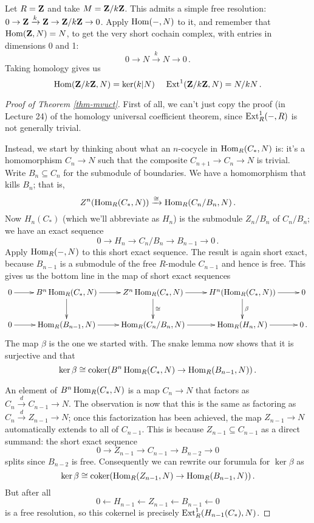 \begin{example}
Let $R=\mathbf Z$ and take $M=\mathbf Z/k\mathbf Z$. This admits a simple free resolution:
$0\to \mathbf Z\xrightarrow{k}\mathbf Z\to\mathbf Z/k\mathbf Z\to 0$. Apply $\operatorname{Hom}(-,N)$ to it,
and remember that $\operatorname{Hom}(\mathbf Z,N)=N$, to get 
the very short cochain complex, with entries in dimensions 0 and 1:
\[
0\to N\xrightarrow{k} N\to0\,.
\]
Taking homology gives us
\[
\operatorname{Hom}(\mathbf Z/k\mathbf Z,N)=\ker(k|N)\,\quad\operatorname{Ext}^1(\mathbf Z/k\mathbf Z,N)=N/kN\,.
\]
\end{example}

\begin{proof}[Proof of Theorem \ref{thm-mvuct}]
First of all, we can't just copy the proof (in Lecture 24) of the
homology universal coefficient theorem, since $\operatorname{Ext}^1_R(-,R)$ is not
generally trivial. 

Instead, we start by thinking about what an $n$-cocycle in $\operatorname{Hom}_R(C_*,N)$ is:
it's a homomorphism $C_n\to N$ such that the composite $C_{n+1}\to C_n\to N$ 
is trivial. Write $B_n\subseteq C_n$ for the submodule of boundaries.
We have a homomorphism that kills $B_n$; that is,
\[
Z^n(\operatorname{Hom}_R(C_*,N))\xrightarrow{\cong}\operatorname{Hom}_R(C_n/B_n,N)\,.
\]
Now $H_n(C_*)$ (which we'll abbreviate as $H_n$) is the submodule
$Z_n/B_n$ of $C_n/B_n$; we have an exact sequence
\begin{equation*}
0\to H_n\to C_n/B_n\to B_{n-1}\to0\,.
\end{equation*}
Apply $\operatorname{Hom}_R(-,N)$ to this short exact sequence. The result is again 
short exact, because $B_{n-1}$ is a submodule of the free $R$-module $C_{n-1}$
and hence is free. This gives us the bottom line in the map of short
exact sequences
\[
\xymatrix{
0 \ar[r] & B^n\Hom_R(C_*,N) \ar[r] \ar[d] & 
Z^n\Hom_R(C_*,N) \ar[d]^\cong \ar[r]
& H^n(\Hom_R(C_*,N)) \ar[d]^\beta \ar[r] & 0\\
0 \ar[r] & \Hom_R(B_{n-1},N) \ar[r] & \Hom_R(C_n/B_n,N) \ar[r] & 
\Hom_R(H_n,N) \ar[r] & 0\,.
}\]
The map $\beta$ is the one we started with. The snake lemma
now shows that it is surjective and that
\[
\ker\beta\cong\operatorname{coker}(B^n\operatorname{Hom}_R(C_*,N)\to\operatorname{Hom}_R(B_{n-1},N))\,.
\]

An element of $B^n\operatorname{Hom}_R(C_*,N)$ is a map $C_n\to N$ that factors as
$C_n\xrightarrow{d}C_{n-1}\to N$. The observation is now that this is
the same as factoring as $C_n\xrightarrow{d}Z_{n-1}\to N$;
once this factorization has been achieved, the map $Z_{n-1}\to N$ 
automatically extends to all of $C_{n-1}$. This is because  
$Z_{n-1}\subseteq C_{n-1}$ as a direct summand: the short exact sequence 
\[
0\to Z_{n-1}\to C_{n-1}\to B_{n-2}\to0
\]
splits since $B_{n-2}$ is free. Consequently we can rewrite our forumula for
$\ker\beta$ as 
\[
\ker\beta\cong\operatorname{coker}(\operatorname{Hom}_R(Z_{n-1},N)\to\operatorname{Hom}_R(B_{n-1},N))\,.
\]
But after all 
\[
0\leftarrow H_{n-1}\leftarrow Z_{n-1}\leftarrow B_{n-1}\leftarrow0
\]
is a free resolution, so this cokernel is precisely 
$\operatorname{Ext}_R^1(H_{n-1}(C_*),N)$.
\end{proof}

